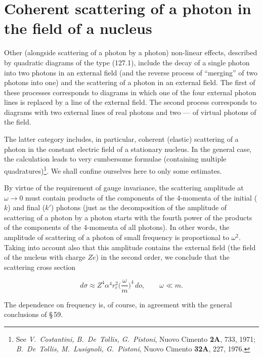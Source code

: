 
\section{Coherent scattering of a photon in the field of a nucleus}


Other (alongside scattering of a photon by a photon) non-linear effects, described by quadratic diagrams of the type (127.1), include the decay of a single photon into two photons in an external field (and the reverse process of ``merging'' of two photons into one) and the scattering of a photon in an external field. The first of these processes corresponds to diagrams in which one of the four external photon lines is replaced by a line of the external field. The second process corresponds to diagrams with two external lines of real photons and two --- of virtual photons of the field.

The latter category includes, in particular, coherent (elastic) scattering of a photon in the constant electric field of a stationary nucleus. In the general case, the calculation leads to very cumbersome formulae (containing multiple quadratures)\footnote{See \emph{V.~Costantini, B.~De~Tollis, G.~Pistoni}, Nuovo Cimento \textbf{2A}, 733, 1971; \emph{B.~De~Tollis, M.~Lusignoli, G.~Pistoni}, Nuovo Cimento \textbf{32A}, 227, 1976.}. We shall confine ourselves here to only some estimates.

By virtue of the requirement of gauge invariance, the scattering amplitude at $\omega \to 0$ must contain products of the components of the 4-momenta of the initial ($k$) and final ($k'$) photons (just as the decomposition of the amplitude of scattering of a photon by a photon starts with the fourth power of the products of the components of the 4-momenta of all photons). In other words, the amplitude of scattering of a photon of small frequency is proportional to $\omega^2$. Taking into account also that this amplitude contains the external field (the field of the nucleus with charge $Ze$) in the second order, we conclude that the scattering cross section

\begin{equation}
d\sigma \approx Z^4\alpha^4 r_e^2 \biggl(\frac{\omega}{m}\biggr)^{\!4} \, do, \qquad \omega \ll m.
\label{eq:128.1}
\end{equation}

The dependence on frequency is, of course, in agreement with the general conclusions of \S\,59.

